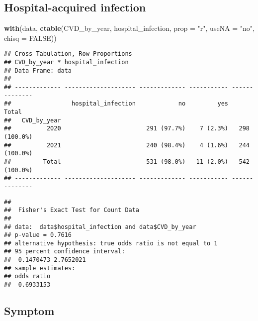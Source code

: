 \documentclass[
]{article}
\newenvironment{Shaded}{\begin{snugshade}}{\end{snugshade}}
\newcommand{\AttributeTok}[1]{\textcolor[rgb]{0.13,0.29,0.53}{#1}}
\newcommand{\ConstantTok}[1]{\textcolor[rgb]{0.56,0.35,0.01}{#1}}
\newcommand{\FunctionTok}[1]{\textcolor[rgb]{0.13,0.29,0.53}{\textbf{#1}}}
\newcommand{\NormalTok}[1]{#1}
\newcommand{\SpecialCharTok}[1]{\textcolor[rgb]{0.81,0.36,0.00}{\textbf{#1}}}
\newcommand{\StringTok}[1]{\textcolor[rgb]{0.31,0.60,0.02}{#1}}
\begin{document}
\hypertarget{hospital-acquired-infection}{%
\subsection{Hospital-acquired
infection}\label{hospital-acquired-infection}}

\begin{Shaded}
\begin{Highlighting}[]
\FunctionTok{with}\NormalTok{(data, }\FunctionTok{ctable}\NormalTok{(CVD\_by\_year, hospital\_infection, }\AttributeTok{prop =} \StringTok{"r"}\NormalTok{, }\AttributeTok{useNA =} \StringTok{"no"}\NormalTok{, }\AttributeTok{chisq =} \ConstantTok{FALSE}\NormalTok{))}
\end{Highlighting}
\end{Shaded}

\begin{verbatim}
## Cross-Tabulation, Row Proportions  
## CVD_by_year * hospital_infection  
## Data Frame: data  
## 
## ------------- -------------------- ------------- ----------- --------------
##                 hospital_infection            no         yes          Total
##   CVD_by_year                                                              
##          2020                        291 (97.7%)    7 (2.3%)   298 (100.0%)
##          2021                        240 (98.4%)    4 (1.6%)   244 (100.0%)
##         Total                        531 (98.0%)   11 (2.0%)   542 (100.0%)
## ------------- -------------------- ------------- ----------- --------------
\end{verbatim}

\begin{Shaded}
\end{Shaded}

\begin{verbatim}
## 
##  Fisher's Exact Test for Count Data
## 
## data:  data$hospital_infection and data$CVD_by_year
## p-value = 0.7616
## alternative hypothesis: true odds ratio is not equal to 1
## 95 percent confidence interval:
##  0.1470473 2.7652021
## sample estimates:
## odds ratio 
##  0.6933153
\end{verbatim}

\hypertarget{symptom}{%
\subsection{Symptom}\label{symptom}}
\end{document}
